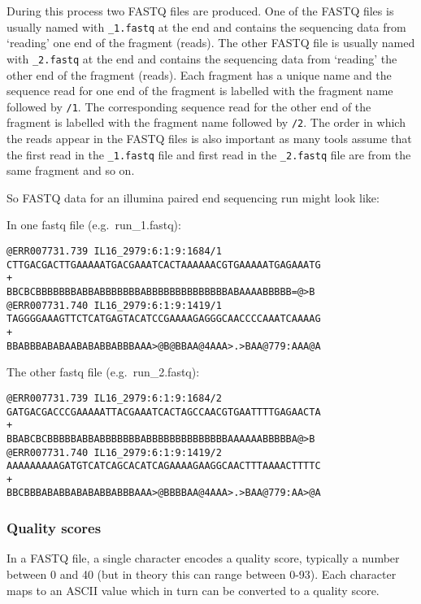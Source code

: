 \documentclass[11pt]{article}
\begin{document}
    During this process two FASTQ files are produced. One of the FASTQ files
is usually named with \texttt{\_1.fastq} at the end and contains the
sequencing data from `reading' one end of the fragment (reads). The
other FASTQ file is usually named with \texttt{\_2.fastq} at the end and
contains the sequencing data from `reading' the other end of the
fragment (reads). Each fragment has a unique name and the sequence read
for one end of the fragment is labelled with the fragment name followed
by \texttt{/1}. The corresponding sequence read for the other end of the
fragment is labelled with the fragment name followed by \texttt{/2}. The
order in which the reads appear in the FASTQ files is also important as
many tools assume that the first read in the \texttt{\_1.fastq} file and
first read in the \texttt{\_2.fastq} file are from the same fragment and
so on.

    So FASTQ data for an illumina paired end sequencing run might look like:

In one fastq file (e.g.~run\_1.fastq):

\begin{verbatim}
@ERR007731.739 IL16_2979:6:1:9:1684/1
CTTGACGACTTGAAAAATGACGAAATCACTAAAAAACGTGAAAAATGAGAAATG
+
BBCBCBBBBBBBABBABBBBBBBABBBBBBBBBBBBBBABAAAABBBBB=@>B
@ERR007731.740 IL16_2979:6:1:9:1419/1
TAGGGGAAAGTTCTCATGAGTACATCCGAAAAGAGGGCAACCCCAAATCAAAAG
+
BBABBBABABAABABABBABBBAAA>@B@BBAA@4AAA>.>BAA@779:AAA@A
\end{verbatim}

The other fastq file (e.g.~run\_2.fastq):

\begin{verbatim}
@ERR007731.739 IL16_2979:6:1:9:1684/2
GATGACGACCCGAAAAATTACGAAATCACTAGCCAACGTGAATTTTGAGAACTA
+
BBABCBCBBBBBABBABBBBBBBABBBBBBBBBBBBBBAAAAAABBBBBA@>B
@ERR007731.740 IL16_2979:6:1:9:1419/2
AAAAAAAAAGATGTCATCAGCACATCAGAAAAGAAGGCAACTTTAAAACTTTTC
+
BBCBBBABABBABABABBABBBAAA>@BBBBAA@4AAA>.>BAA@779:AA>@A
\end{verbatim}

    \hypertarget{quality-scores}{%
\subsubsection{Quality scores}\label{quality-scores}}

In a FASTQ file, a single character encodes a quality score, typically a
number between 0 and 40 (but in theory this can range between 0-93).
Each character maps to an ASCII value which in turn can be converted to
a quality score.
\end{document}
